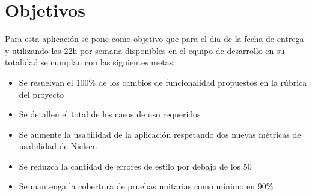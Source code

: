 \section{Objetivos}

Para esta aplicación se pone como objetivo que para el dia de la fecha de entrega y utilizando las 22h por semana disponibles en el equipo de desarrollo en su totalidad se cumplan con las siguientes metas:
\begin{itemize}
    \item Se resuelvan el 100\% de los cambios de funcionalidad propuestos en la rúbrica del proyecto
    \item Se detallen el total de los casos de uso requeridos
    \item Se aumente la usabilidad de la aplicación respetando dos nuevas métricas de usabilidad de Nielsen
    \item Se reduzca la cantidad de errores de estilo por debajo de los 50
    \item Se mantenga la cobertura de pruebas unitarias como mínimo en 90\%
\end{itemize}
  
